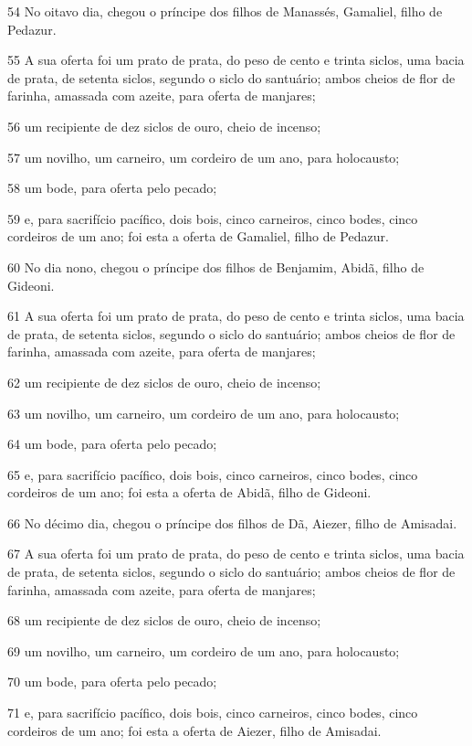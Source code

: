 \par 54 No oitavo dia, chegou o príncipe dos filhos de Manassés, Gamaliel, filho de Pedazur.
\par 55 A sua oferta foi um prato de prata, do peso de cento e trinta siclos, uma bacia de prata, de setenta siclos, segundo o siclo do santuário; ambos cheios de flor de farinha, amassada com azeite, para oferta de manjares;
\par 56 um recipiente de dez siclos de ouro, cheio de incenso;
\par 57 um novilho, um carneiro, um cordeiro de um ano, para holocausto;
\par 58 um bode, para oferta pelo pecado;
\par 59 e, para sacrifício pacífico, dois bois, cinco carneiros, cinco bodes, cinco cordeiros de um ano; foi esta a oferta de Gamaliel, filho de Pedazur.
\par 60 No dia nono, chegou o príncipe dos filhos de Benjamim, Abidã, filho de Gideoni.
\par 61 A sua oferta foi um prato de prata, do peso de cento e trinta siclos, uma bacia de prata, de setenta siclos, segundo o siclo do santuário; ambos cheios de flor de farinha, amassada com azeite, para oferta de manjares;
\par 62 um recipiente de dez siclos de ouro, cheio de incenso;
\par 63 um novilho, um carneiro, um cordeiro de um ano, para holocausto;
\par 64 um bode, para oferta pelo pecado;
\par 65 e, para sacrifício pacífico, dois bois, cinco carneiros, cinco bodes, cinco cordeiros de um ano; foi esta a oferta de Abidã, filho de Gideoni.
\par 66 No décimo dia, chegou o príncipe dos filhos de Dã, Aiezer, filho de Amisadai.
\par 67 A sua oferta foi um prato de prata, do peso de cento e trinta siclos, uma bacia de prata, de setenta siclos, segundo o siclo do santuário; ambos cheios de flor de farinha, amassada com azeite, para oferta de manjares;
\par 68 um recipiente de dez siclos de ouro, cheio de incenso;
\par 69 um novilho, um carneiro, um cordeiro de um ano, para holocausto;
\par 70 um bode, para oferta pelo pecado;
\par 71 e, para sacrifício pacífico, dois bois, cinco carneiros, cinco bodes, cinco cordeiros de um ano; foi esta a oferta de Aiezer, filho de Amisadai.
